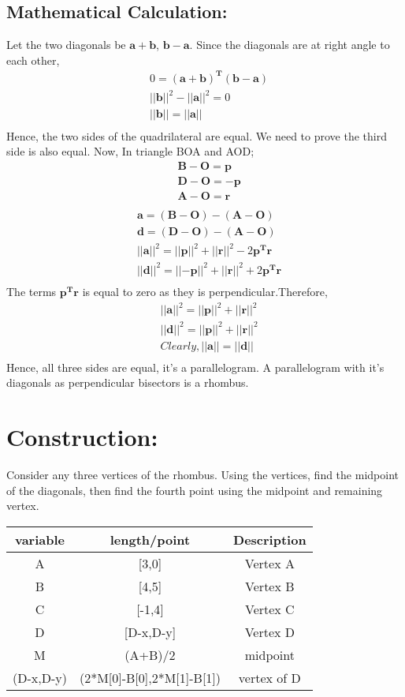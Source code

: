 \documentclass[a4paper,12pt,twocolumn]{article}
\let\vec\mathbf
\begin{document}
\subsection{Mathematical Calculation:}
Let the two diagonals be $\vec{a+b}$, $\vec{b-a}$. Since the diagonals are at right angle to each other,
\begin{align}
&0 = \vec{(a+b)^T}\vec{(b-a)}\\	
&||\vec{b}||^2 - ||\vec{a}||^2 = 0\\
&||\vec{b}|| = ||\vec{a}||\\
\end{align}
Hence, the two sides of the quadrilateral are equal. We need to prove the third side is also equal.
Now,
In triangle BOA and AOD;
\begin{align}
	&\vec{B-O} = \vec{p}\\
	&\vec{D-O} = \vec{-p}\\
	&\vec{A-O} = \vec{r}\\
\end{align}
\begin{align}
	&\vec{a} = \vec{(B-O)} - \vec{(A-O)}\\ 
	&\vec{d} = \vec{(D-O)} - \vec{(A-O)}\\
&||\vec{a}||^2 = ||\vec{p}||^2 + ||\vec{r}||^2 - 2\vec{p^Tr}\\
&||\vec{d}||^2 = ||\vec{-p}||^2 + ||\vec{r}||^2 + 2\vec{p^Tr}\\
\end{align}
The terms $\vec{p^Tr}$ is equal to zero as they is perpendicular.Therefore,
\begin{align}
	&||\vec{a}||^2 = ||\vec{p}||^2 + ||\vec{r}||^2\\
	&||\vec{d}||^2 = ||\vec{p}||^2 + ||\vec{r}||^2\\
	&Clearly, ||\vec{a}|| = ||\vec{d}||\\
\end{align}
Hence, all three sides are equal, it's a parallelogram. A parallelogram with it's diagonals as perpendicular bisectors is a rhombus.
\section{Construction:}
Consider any  three vertices of the rhombus. Using the vertices, find the midpoint of the diagonals, then find the fourth point using the midpoint and remaining vertex. 
\begin{table}[h]
	\centering
\setlength\extrarowheight{2pt}
	\begin{tabular}{|c|c|c|}
		\hline
		\textbf{variable} & \textbf{length/point} & \textbf{Description}\\
		\hline
		A & [3,0] & Vertex A\\
		\hline
		B & [4,5] & Vertex B\\
		\hline
		C & [-1,4] & Vertex C\\
		\hline                   
		D & [D-x,D-y] & Vertex D\\
		\hline
		M & (A+B)/2 & midpoint\\
		\hline
		(D-x,D-y) & (2*M[0]-B[0],2*M[1]-B[1]) & vertex of D\\
		\hline
	\end{tabular}
\end{table}
\end{document}

